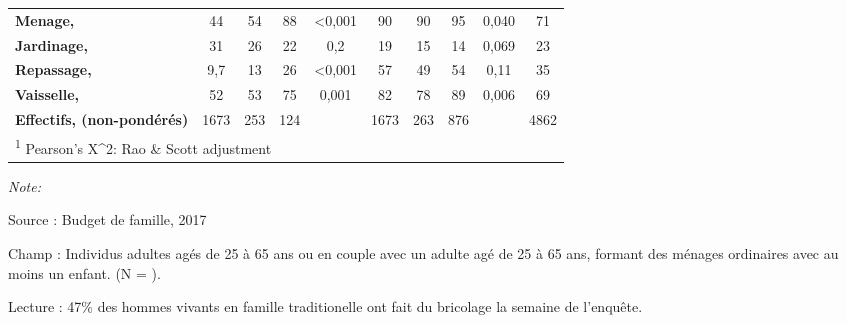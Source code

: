 \documentclass[
  12pt,
]{book}
\begin{document}
\begin{table}[!h]
{\begin{threeparttable}
\begin{tabular}[t]{lccccccccc}
\hspace{1em}\textbf{Menage, } & 44 & 54 & 88 & <0,001 & 90 & 90 & 95 & 0,040 & 71\\
\hspace{1em}\textbf{Jardinage, } & 31 & 26 & 22 & 0,2 & 19 & 15 & 14 & 0,069 & 23\\
\hspace{1em}\textbf{Repassage, } & 9,7 & 13 & 26 & <0,001 & 57 & 49 & 54 & 0,11 & 35\\
\hspace{1em}\textbf{Vaisselle, } & 52 & 53 & 75 & 0,001 & 82 & 78 & 89 & 0,006 & 69\\
\textbf{Effectifs, (non-pondérés)} & 1673 & 253 & 124 &  & 1673 & 263 & 876 &  & 4862\\
\bottomrule
\multicolumn{10}{l}{\rule{0pt}{1em}\textsuperscript{1} Pearson's X\textasciicircum{}2: Rao \& Scott adjustment}\\
\end{tabular}
\begin{tablenotes}
\item \textit{Note: } 
\item Source : Budget de famille, 2017
\item Champ : Individus adultes agés de 25 à 65 ans ou en couple avec un adulte agé de 25 à 65 ans, formant des ménages ordinaires avec au moins un enfant. (N = ).
\item Lecture : 47\% des hommes vivants en famille traditionelle ont fait du bricolage la semaine de l'enquête.
\end{tablenotes}
\end{threeparttable}}
\end{table}
\end{document}
